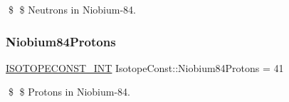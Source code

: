 \$ \$ Neutrons in Niobium-\/84. \mbox{\label{group___isotope_const-_niobium-_nb84_gaabbbb0f52addc00adb6d8c08ef7ca313}} 
\subsubsection{\texorpdfstring{Niobium84\+Protons}{Niobium84Protons}}
{\footnotesize\ttfamily \mbox{\hyperlink{group___isotope_const-_macros_ga5f18360b3e99483a35c32d789e62621c}{I\+S\+O\+T\+O\+P\+E\+C\+O\+N\+S\+T\+\_\+\+I\+NT}} Isotope\+Const\+::\+Niobium84\+Protons = 41}

\$ \$ Protons in Niobium-\/84. 